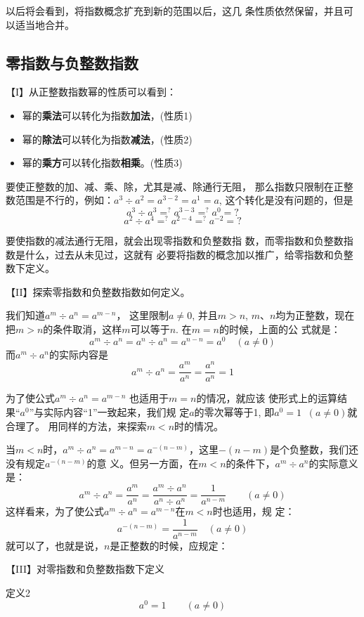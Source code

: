 以后将会看到，将指数概念扩充到新的范围以后，这几
条性质依然保留，并且可以适当地合并。

\subsection{零指数与负整数指数}

【I】从正整数指数幂的性质可以看到：
\begin{itemize}
    \item 幂的\textbf{乘法}可以转化为指数\textbf{加法}，(性质1)
    \item 幂的\textbf{除法}可以转化为指数\textbf{减法}，(性质2)
    \item 幂的\textbf{乘方}可以转化指数\textbf{相乘}。(性质3)
\end{itemize}

要使正整数的加、减、乘、除，尤其是减、除通行无阻，
那么指数只限制在正整数范围是不行的，例如：$a^3\div a^2=
a^{3-2}=a^1=a$, 这个转化是没有问题的，但是
\[a^3\div a^3 \mathop{=}^{?} a^{3-3} \mathop{=}^{?} a^0=?\]
\[a^2\div a^4 \mathop{=}^{?} a^{2-4} \mathop{=}^{?} a^{-2}=?\]

要使指数的减法通行无阻，就会出现零指数和负整数指
数，而零指数和负整数指数是什么，过去从未见过，这就有
必要将指数的概念加以推广，给零指数和负整数下定义。

【II】探索零指数和负整数指数如何定义。

我们知道$a^m\div a^n=a^{m-n}$，
这里限制$a\ne 0$, 并且$m>n$, $m$、$n$均为正整数，现在把$m>
n$的条件取消，这样$m$可以等于$n$. 在$m=n$的时候，上面的公
式就是：
\[a^m\div a^n=a^n\div a^n=a^{n-n}=a^0\quad (a\ne 0)\]
而$a^m\div a^n$的实际内容是
\[a^m\div a^n=\frac{a^m}{a^n}=\frac{a^n}{a^n}=1\]

为了使公式$a^m\div a^n=a^{m-n}$
也适用于$m=n$的情况，就应该
使形式上的运算结果“$a^0$”与实际内容“1”一致起来，我们规
定$a$的零次幂等于1, 即$a^0=1\;\;  (a\ne 0)$就合理了。
用同样的方法，来探索$m<n$时的情况。

当$m<n$时，$a^m\div a^n=a^{m-n}=a^{-(n-m)}$，这里$-(n-m)$是个负整数，我们还没有规定$a^{-(n-m)}$的意
义。但另一方面，在$m<n$的条件下，$a^m\div a^n$的实际意义是：
\[a^m\div a^n=\frac{a^m}{a^n}=\frac{a^m\div a^n}{a^n\div a^n}=\frac{1}{a^{n-m}}\qquad (a\ne 0)\]
这样看来，为了使公式$a^m\div a^n=a^{m-n}$在$m<n$时也适用，规
定：
\[a^{-(n-m)}=\frac{1}{a^{n-m}}\quad (a\ne 0)  \]
就可以了，也就是说，$n$是正整数的时候，应规定：


【III】对零指数和负整数指数下定义

\begin{blk}{定义2}
    \[a^0=1\qquad  (a\ne 0)\]
\end{blk}

